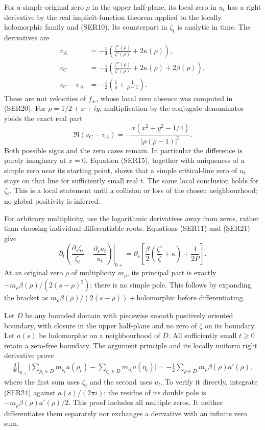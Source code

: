 \documentclass[
  10pt,
  a4paper,
]{article}
\begin{document}
For a simple original zero \(\rho\) in the upper half-plane, its local
zero in \(u_t\) has a right derivative by the real implicit-function
theorem applied to the locally holomorphic family and (SER10). Its
counterpart in \(\zeta_t\) is analytic in time. The derivatives are \[
\begin{aligned}
v_A&=-\frac14\left(\frac{\zeta''(\rho)}{\zeta'(\rho)}+2\kappa(\rho)\right),\\
v_C&=-\frac14\left(\frac{\zeta''(\rho)}{\zeta'(\rho)}+2\kappa(\rho)+2\beta(\rho)\right),\\
v_C-v_A&=-\frac12\left(\frac1\rho+\frac1{\rho-1}\right).
\end{aligned}\tag{SER22}
\] These are not velocities of \(f_\pm\), whose local zero absence was
computed in (SER20). For \(\rho=1/2+x+iy\), multiplication by the
conjugate denominator yields the exact real part \[
\Re(v_C-v_A)=
-\frac{x(x^2+y^2-1/4)}{|\rho(\rho-1)|^2}.
\tag{SER23}
\] Both possible signs and the zero cases remain. In particular the
difference is purely imaginary at \(x=0\). Equation (SER15), together
with uniqueness of a simple zero near its starting point, shows that a
simple critical-line zero of \(u_t\) stays on that line for sufficiently
small real \(t\). The same local conclusion holds for \(\zeta_t\). This
is a local statement until a collision or loss of the chosen
neighbourhood; no global positivity is inferred.

For arbitrary multiplicity, use the logarithmic derivatives away from
zeros, rather than choosing individual differentiable roots. Equations
(SER11) and (SER21) give \[
\left.\partial_t\left(
\frac{\partial_s\zeta_t}{\zeta_t}
-\frac{\partial_su_t}{u_t}\right)\right|_{0+}
=\partial_s\left[
\frac\beta2\left(\frac{\zeta'}\zeta+\kappa\right)+\frac1{2P}\right].
\tag{SER24}
\] At an original zero \(\rho\) of multiplicity \(m_\rho\), its
principal part is exactly \(-m_\rho\beta(\rho)/(2(s-\rho)^2)\); there is
no simple pole. This follows by expanding the bracket as
\(m_\rho\beta(\rho)/(2(s-\rho))+\text{holomorphic}\) before
differentiating.

Let \(D\) be any bounded domain with piecewise smooth positively
oriented boundary, with closure in the upper half-plane and no zero of
\(\zeta\) on its boundary. Let \(a(s)\) be holomorphic on a
neighbourhood of \(\overline D\). All sufficiently small \(t\ge0\)
retain a zero-free boundary. The argument principle and its locally
uniform right derivative prove \[
\begin{aligned}
\left.\frac d{dt}\right|_{0+}
\bigg[
 \sum_{\rho_t\in D}m_{\rho_t}a(\rho_t)
 -\sum_{\eta_t\in D}m_{\eta_t}a(\eta_t)
\bigg]
 =-\frac12\sum_{\rho\in D}m_\rho\beta(\rho)a'(\rho),
\end{aligned}\tag{SER25}
\] where the first sum uses \(\zeta_t\) and the second uses \(u_t\). To
verify it directly, integrate (SER24) against \(a(s)/(2\pi i)\); the
residue of its double pole is \(-m_\rho\beta(\rho)a'(\rho)/2\). This
proof includes all multiple zeros. It neither differentiates them
separately nor exchanges a derivative with an infinite zero sum.
\end{document}
